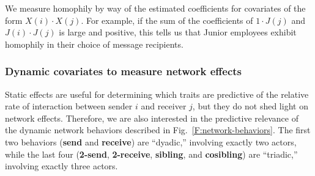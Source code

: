 \documentclass[final]{statsoc}
\begin{document}
We measure homophily by way of the estimated coefficients for covariates of
the form $X(i) \cdot X(j)$.  For example, if the sum of the coefficients of $1
\cdot J(j)$ and $J(i) \cdot J(j)$ is large and positive, this tells us that
Junior employees exhibit homophily in their choice of message recipients.


\subsubsection{Dynamic covariates to measure network effects}

Static effects are useful for determining which traits are predictive of the
relative rate of interaction between sender $i$ and receiver $j$, but they do
not shed light on network effects.  Therefore, we are also interested in the predictive
relevance of the dynamic network behaviors described in
Fig.~\ref{F:network-behaviors}.  The first two behaviors (\textbf{send} and
\textbf{receive}) are ``dyadic,'' involving exactly two actors, while the last
four (\textbf{2-send}, \textbf{2-receive}, \textbf{sibling}, and
\textbf{cosibling}) are ``triadic,'' involving exactly three actors.
\end{document}
